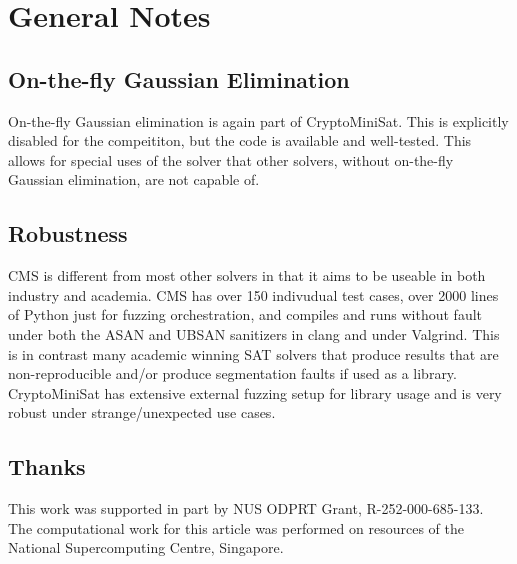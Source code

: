 \documentclass[final]{ieee}
\begin{document}
\section{General Notes}
\subsection{On-the-fly Gaussian Elimination}
On-the-fly Gaussian elimination is again part of CryptoMiniSat. This is explicitly disabled for the compeititon, but the code is available and well-tested. This allows for special uses of the solver that other solvers, without on-the-fly Gaussian elimination, are not capable of.

\subsection{Robustness}
CMS is different from most other solvers in that it aims to be useable in both industry and academia. CMS has over 150 indivudual test cases, over 2000 lines of Python just for fuzzing orchestration, and compiles and runs without fault under both the ASAN and UBSAN sanitizers in clang and under Valgrind. This is in contrast many academic winning SAT solvers that produce results that are non-reproducible and/or produce segmentation faults if used as a library. CryptoMiniSat has extensive external fuzzing setup for library usage and is very robust under strange/unexpected use cases.

\subsection{Thanks}
This work was supported in part by NUS ODPRT Grant, R-252-000-685-133. The computational work for this article was performed on resources of the National Supercomputing Centre, Singapore\cite{nscc}.





\vfill
\pagebreak
\end{document}

